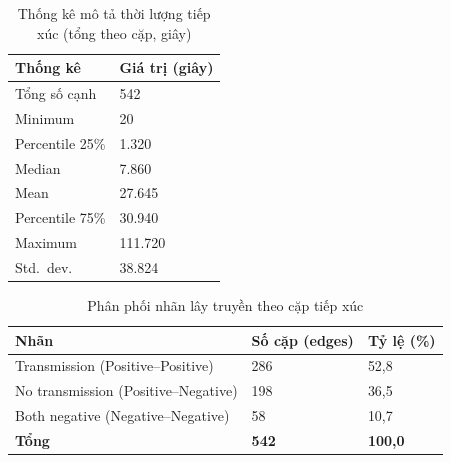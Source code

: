 \documentclass[12pt,a4paper]{report}
\theoremstyle{definition}
\begin{document}
\begin{table}[H]
\centering
\caption{Thống kê mô tả thời lượng tiếp xúc (tổng theo cặp, giây)}
\label{tab:edge_stats}
\begin{tabular}{L{4cm} R{3cm}}
\toprule
\textbf{Thống kê} & \textbf{Giá trị (giây)}\\
\midrule
Tổng số cạnh    & 542\\
Minimum         & 20\\
Percentile 25\% & 1.320\\
Median          & 7.860\\
Mean            & 27.645\\
Percentile 75\% & 30.940\\
Maximum         & 111.720\\
Std.\ dev.      & 38.824\\
\bottomrule
\end{tabular}
\end{table}

\begin{table}[H]
\centering
\caption{Phân phối nhãn lây truyền theo cặp tiếp xúc}
\label{tab:edge_labels}
\begin{tabular}{L{5cm} C{3cm} C{3cm}}
\toprule
\textbf{Nhãn} & \textbf{Số cặp (edges)} & \textbf{Tỷ lệ (\%)}\\
\midrule
Transmission (Positive--Positive) & 286 & 52,8\\
No transmission (Positive--Negative) & 198 & 36,5\\
Both negative (Negative--Negative) &  58 & 10,7\\
\midrule
\textbf{Tổng} & \textbf{542} & \textbf{100,0}\\
\bottomrule
\end{tabular}
\end{table}
\end{document}
